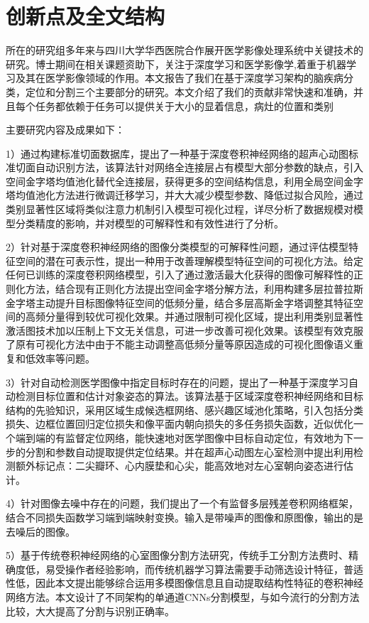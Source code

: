 {\section{创新点及全文结构}

所在的研究组多年来与四川大学华西医院合作展开医学影像处理系统中关键技术的研究。博士期间在相关课题资助下，关注于深度学习和医学影像学,着重于机器学习及其在医学影像领域的作用。本文报告了我们在基于深度学习架构的脑疾病分类，定位和分割三个主要部分的研究。本文介绍了我们的贡献非常快速和准确，并且每个任务都依赖于任务可以提供关于大小的显着信息，病灶的位置和类别

主要研究内容及成果如下：

1）通过构建标准切面数据库，提出了一种基于深度卷积神经网络的超声心动图标准切面自动识别方法，该算法针对网络全连接层占有模型大部分参数的缺点，引入空间金字塔均值池化替代全连接层，获得更多的空间结构信息，利用全局空间金字塔均值池化方法进行微调迁移学习，并大大减少模型参数、降低过拟合风险，通过类别显著性区域将类似注意力机制引入模型可视化过程，详尽分析了数据规模对模型分类精度的影响，并对模型的可解释性和有效性进行了分析。

2）针对基于深度卷积神经网络的图像分类模型的可解释性问题，通过评估模型特征空间的潜在可表示性，提出一种用于改善理解模型特征空间的可视化方法。给定任何已训练的深度卷积网络模型，引入了通过激活最大化获得的图像可解释性的正则化方法，结合现有正则化方法提出空间金字塔分解方法，利用构建多层拉普拉斯金字塔主动提升目标图像特征空间的低频分量，结合多层高斯金字塔调整其特征空间的高频分量得到较优可视化效果。并通过限制可视化区域，提出利用类别显著性激活图技术加以压制上下文无关信息，可进一步改善可视化效果。该模型有效克服了原有可视化方法中由于不能主动调整高低频分量等原因造成的可视化图像语义重复和低效率等问题。

3）针对自动检测医学图像中指定目标时存在的问题，提出了一种基于深度学习自动检测目标位置和估计对象姿态的算法。该算法基于区域深度卷积神经网络和目标结构的先验知识，采用区域生成候选框网络、感兴趣区域池化策略，引入包括分类损失、边框位置回归定位损失和像平面内朝向损失的多任务损失函数，近似优化一个端到端的有监督定位网络，能快速地对医学图像中目标自动定位，有效地为下一步的分割和参数自动提取提供定位结果。并在超声心动图左心室检测中提出利用检测额外标记点：二尖瓣环、心内膜垫和心尖，能高效地对左心室朝向姿态进行估计。

4）针对图像去噪中存在的问题，我们提出了一个有监督多层残差卷积网络框架，结合不同损失函数学习端到端映射变换。输入是带噪声的图像和原图像，输出的是去噪后的图像。

5）基于传统卷积神经网络的心室图像分割方法研究，传统手工分割方法费时、精确度低，易受操作者经验影响，而传统机器学习算法需要手动筛选设计特征，普适性低，因此本文提出能够综合运用多模图像信息且自动提取结构性特征的卷积神经网络方法。本文设计了不同架构的单通道CNNs分割模型，与如今流行的分割方法比较，大大提高了分割与识别正确率。 


}
